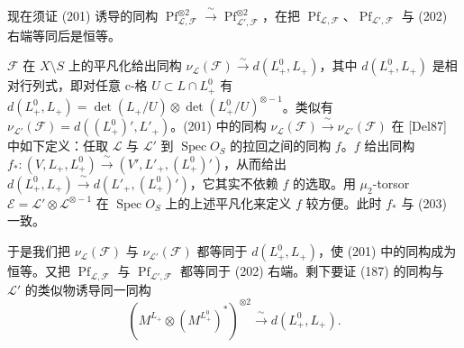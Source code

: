 现在须证 (201) 诱导的同构 $\operatorname{Pf}_{\mathcal{L},\mathcal{F}}^{\otimes 2}\xrightarrow{\ \sim\ }\operatorname{Pf}_{\mathcal{L}',\mathcal{F}}^{\otimes 2}$，在把 $\operatorname{Pf}_{\mathcal{L},\mathcal{F}}$、$\operatorname{Pf}_{\mathcal{L}',\mathcal{F}}$ 与 (202) 右端等同后是恒等。

$\mathcal{F}$ 在 $X\setminus S$ 上的平凡化给出同构 $\nu_{\mathcal{L}}(\mathcal{F})\xrightarrow{\ \sim\ }d(L_{+}^{0},L_{+})$，其中 $d(L_{+}^{0},L_{+})$ 是相对行列式，即对任意 c-格 $U\subset L\cap L_{+}^{0}$ 有 $d(L_{+}^{0},L_{+})=\det(L_{+}/U)\otimes\det(L_{+}^{0}/U)^{\otimes-1}$。类似有 $\nu_{\mathcal{L}'}(\mathcal{F})=d((L_{+}^{0})',L'_{+})$。(201) 中的同构 $\nu_{\mathcal{L}}(\mathcal{F})\xrightarrow{\ \sim\ }\nu_{\mathcal{L}'}(\mathcal{F})$ 在 [Del87] 中如下定义：任取 $\mathcal{L}$ 与 $\mathcal{L}'$ 到 $\operatorname{Spec} O_{S}$ 的拉回之间的同构 $f$。$f$ 给出同构 $f_{*}:(V,L_{+},L_{+}^{0})\xrightarrow{\ \sim\ }(V',L'_{+},(L_{+}^{0})')$，从而给出 $d(L_{+}^{0},L_{+})\xrightarrow{\ \sim\ }d(L'_{+},(L_{+}^{0})')$，它其实不依赖 $f$ 的选取。用 $\mu_{2}$-torsor $\mathcal{E}=\mathcal{L}'\otimes\mathcal{L}^{\otimes-1}$ 在 $\operatorname{Spec} O_{S}$ 上的上述平凡化来定义 $f$ 较方便。此时 $f_{*}$ 与 (203) 一致。

于是我们把 $\nu_{\mathcal{L}}(\mathcal{F})$ 与 $\nu_{\mathcal{L}'}(\mathcal{F})$ 都等同于 $d(L_{+}^{0},L_{+})$，使 (201) 中的同构成为恒等。又把 $\operatorname{Pf}_{\mathcal{L},\mathcal{F}}$ 与 $\operatorname{Pf}_{\mathcal{L}',\mathcal{F}}$ 都等同于 (202) 右端。剩下要证 (187) 的同构与 $\mathcal{L}'$ 的类似物诱导同一同构
\begin{equation}\tag{204}
(M^{L_{+}}\otimes(M^{L_{+}^{0}})^{*})^{\otimes 2}\xrightarrow{\ \sim\ }d(L_{+}^{0},L_{+}).
\end{equation}

